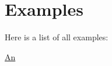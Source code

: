 \section{Examples}
Here is a list of all examples\+:\begin{DoxyCompactItemize}
\item 
\mbox{\hyperlink{_an-example}{An}}
\end{DoxyCompactItemize}
